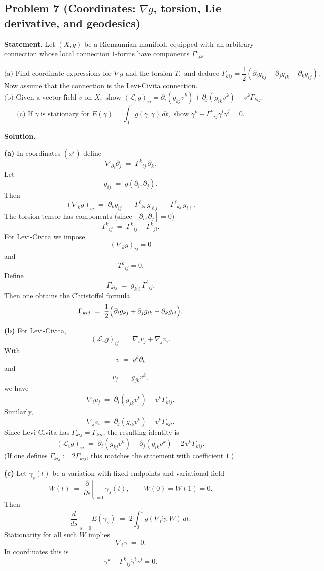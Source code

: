 \documentclass[12pt,a4paper]{article}
\theoremstyle{plain}
\theoremstyle{definition}      %
\begin{document}
\subsection*{Problem 7 (Coordinates: $\nabla g$, torsion, Lie derivative, and geodesics)}

\textbf{Statement.}
Let $(X,g)$ be a Riemannian manifold, equipped with an arbitrary connection whose local connection $1$-forms have components $\Gamma^i{}_{jk}$.

\[
\text{(a) Find coordinate expressions for } \nabla g \text{ and the torsion } T, \text{ and deduce }
\Gamma_{kij}=\frac12(\partial_i g_{kj}+\partial_j g_{ik}-\partial_k g_{ij}).
\]
Now assume that the connection is the Levi-Civita connection.
\[
\text{(b) Given a vector field } v \text{ on } X,\text{ show }
(\mathcal{L}_v g)_{ij}=\partial_i(g_{kj}v^k)+\partial_j(g_{ik}v^k)-v^k\Gamma_{kij}.
\]
\[
\text{(c) If } \gamma \text{ is stationary for } E(\gamma)=\int_0^1 g(\dot\gamma,\dot\gamma)\,dt,\text{ show }
\ddot\gamma^k+\Gamma^k{}_{ij}\dot\gamma^i\dot\gamma^j=0.
\]

\textbf{Solution.}

\textbf{(a)}
In coordinates $(x^i)$ define
\[
\nabla_{\partial_i}\partial_j \;=\;\Gamma^k{}_{ij}\,\partial_k.
\]
Let
\[
g_{ij}\;=\;g(\partial_i,\partial_j).
\]
Then
\[
(\nabla_k g)_{ij}
\;=\;
\partial_k g_{ij}
\;-\;
\Gamma^\ell{}_{ki}\,g_{\ell j}
\;-\;
\Gamma^\ell{}_{kj}\,g_{i\ell}.
\]
The torsion tensor has components (since $[\partial_i,\partial_j]=0$)
\[
T^k{}_{ij}
\;=\;
\Gamma^k{}_{ij}-\Gamma^k{}_{ji}.
\]
For Levi-Civita we impose
\[
(\nabla_k g)_{ij}=0
\]
and
\[
T^k{}_{ij}=0.
\]
Define
\[
\Gamma_{kij}\;=\;g_{k\ell}\Gamma^\ell{}_{ij}.
\]
Then one obtains the Christoffel formula
\[
\Gamma_{kij}
\;=\;
\frac12\Bigl(\partial_i g_{kj}+\partial_j g_{ik}-\partial_k g_{ij}\Bigr).
\]

\textbf{(b)}
For Levi-Civita,
\[
(\mathcal{L}_v g)_{ij}
\;=\;
\nabla_i v_j+\nabla_j v_i.
\]
With
\[
v\;=\;v^k\partial_k
\]
and
\[
v_j\;=\;g_{jk}v^k,
\]
we have
\[
\nabla_i v_j
\;=\;
\partial_i(g_{jk}v^k)-v^k\Gamma_{kij}.
\]
Similarly,
\[
\nabla_j v_i
\;=\;
\partial_j(g_{ik}v^k)-v^k\Gamma_{kji}.
\]
Since Levi-Civita has $\Gamma_{kij}=\Gamma_{kji}$, the resulting identity is
\[
(\mathcal{L}_v g)_{ij}
\;=\;
\partial_i(g_{kj}v^k)+\partial_j(g_{ik}v^k)-2\,v^k\Gamma_{kij}.
\]
(If one defines $\widetilde\Gamma_{kij}:=2\Gamma_{kij}$, this matches the statement with coefficient $1$.)

\textbf{(c)}
Let $\gamma_s(t)$ be a variation with fixed endpoints and variational field
\[
W(t)\;=\;\left.\frac{\partial}{\partial s}\right|_{s=0}\gamma_s(t),
\qquad
W(0)=W(1)=0.
\]
Then
\[
\left.\frac{d}{ds}\right|_{s=0}E(\gamma_s)
\;=\;
2\int_0^1 g(\nabla_t\dot\gamma,W)\,dt.
\]
Stationarity for all such $W$ implies
\[
\nabla_t\dot\gamma\;=\;0.
\]
In coordinates this is
\[
\ddot\gamma^k+\Gamma^k{}_{ij}\dot\gamma^i\dot\gamma^j=0.
\]
\end{document}
